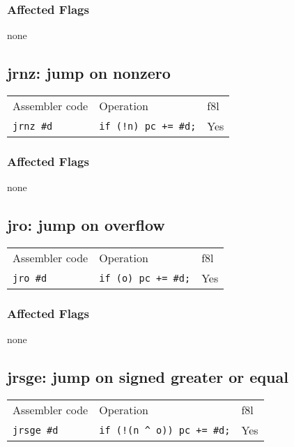 \documentclass{book}
\begin{document}
\subsubsection*{Affected Flags}

none


\subsection{jrnz: jump on nonzero}

\begin{tabular}{l l l}
Assembler code    & Operation                   & f8l \\
\texttt{jrnz \#d} & \texttt{if (!n) pc += \#d;} & Yes \\
\end{tabular}

\subsubsection*{Affected Flags}

none


\subsection{jro: jump on overflow}

\begin{tabular}{l l l}
Assembler code   & Operation                  & f8l \\
\texttt{jro \#d} & \texttt{if (o) pc += \#d;} & Yes \\
\end{tabular}

\subsubsection*{Affected Flags}

none


\subsection{jrsge: jump on signed greater or equal}

\begin{tabular}{l l l}
Assembler code     & Operation                            & f8l \\
\texttt{jrsge \#d} & \texttt{if (!(n \^{} o)) pc += \#d;} & Yes \\
\end{tabular}
\end{document}
